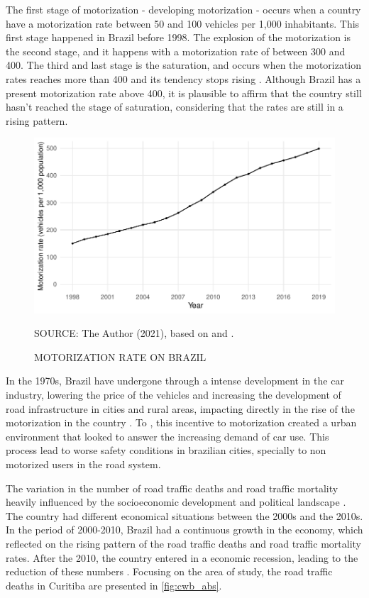 The first stage of motorization - developing motorization - occurs when a country have a motorization rate between 50 and 100 vehicles per 1,000 inhabitants. This first stage happened in Brazil before 1998. The explosion of the motorization is the second stage, and it happens with a motorization rate of between 300 and 400. The third and last stage is the saturation, and occurs when the motorization rates reaches more than 400 and its tendency stops rising \cite{Jorgensen2005}. Although Brazil has a present motorization rate above 400, it is plausible to affirm that the country still hasn't reached the stage of saturation, considering that the rates are still in a rising pattern. 

\begin{figure}[!htbp]
    \centering\footnotesize
    \captionsetup{font=footnotesize}
    \caption{MOTORIZATION RATE ON BRAZIL}
    \includegraphics{fig/brazil_motor.pdf}
    \label{fig:br_motor}
    \par SOURCE: The Author (2021), based on \textcite{MinistryofHealth2021} and \textcite{DENATRAN2020}.
\end{figure} 

In the 1970s, Brazil have undergone through a intense development in the car industry, lowering the price of the vehicles and increasing the development of road infrastructure in cities and rural areas, impacting directly in the rise of the motorization in the country \cite{Vasconcellos2013}. To \textcite{Harvey1982}, this incentive to motorization created a urban environment that looked to answer the increasing demand of car use. This process lead to worse safety conditions in brazilian cities, specially to non motorized users in the road system.   

The variation in the number of road traffic deaths and road traffic mortality heavily influenced by the socioeconomic development and political landscape \cite{Ferraz2012}. The country had different economical situations between the 2000s and the 2010s. In the period of 2000-2010, Brazil had a continuous growth in the economy, which reflected on the rising pattern of the road traffic deaths and road traffic mortality rates. After the 2010, the country entered in a economic recession, leading to the reduction of these numbers \cite{Bastos2020}. Focusing on the area of study, the road traffic deaths in Curitiba are presented in \autoref{fig:cwb_abs}.   

